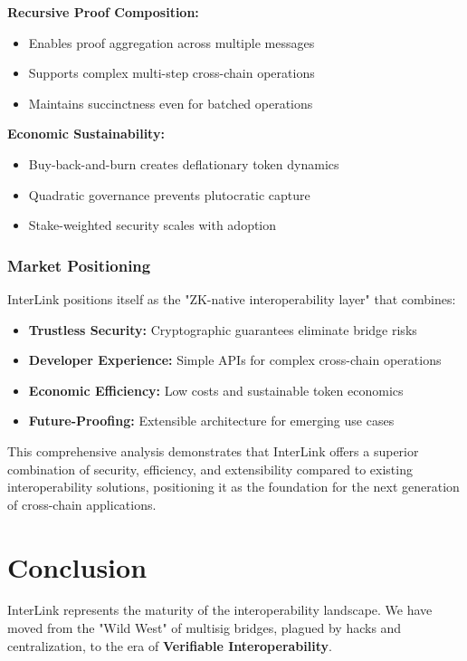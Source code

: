\documentclass[11pt,a4paper]{article}
\begin{document}
\textbf{Recursive Proof Composition:}
\begin{itemize}
    \item Enables proof aggregation across multiple messages
    \item Supports complex multi-step cross-chain operations
    \item Maintains succinctness even for batched operations
\end{itemize}

\textbf{Economic Sustainability:}
\begin{itemize}
    \item Buy-back-and-burn creates deflationary token dynamics
    \item Quadratic governance prevents plutocratic capture
    \item Stake-weighted security scales with adoption
\end{itemize}

\subsubsection{Market Positioning}

InterLink positions itself as the "ZK-native interoperability layer" that combines:
\begin{itemize}
    \item \textbf{Trustless Security:} Cryptographic guarantees eliminate bridge risks
    \item \textbf{Developer Experience:} Simple APIs for complex cross-chain operations
    \item \textbf{Economic Efficiency:} Low costs and sustainable token economics
    \item \textbf{Future-Proofing:} Extensible architecture for emerging use cases
\end{itemize}

This comprehensive analysis demonstrates that InterLink offers a superior combination of security, efficiency, and extensibility compared to existing interoperability solutions, positioning it as the foundation for the next generation of cross-chain applications.

\section{Conclusion}

InterLink represents the maturity of the interoperability landscape. We have moved from the "Wild West" of multisig bridges, plagued by hacks and centralization, to the era of \textbf{Verifiable Interoperability}.
\end{document}
